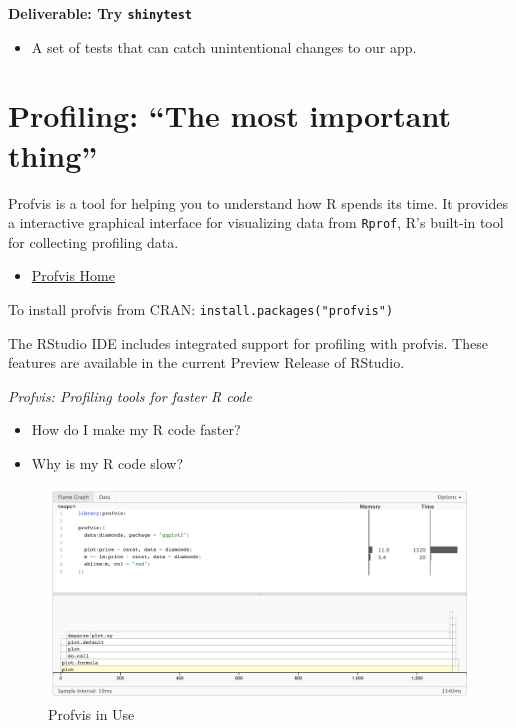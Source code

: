 \documentclass[]{book}
\providecommand{\tightlist}{%
  \setlength{\itemsep}{0pt}\setlength{\parskip}{0pt}}
\theoremstyle{definition}
\theoremstyle{definition}
\theoremstyle{definition}
\theoremstyle{remark}
\begin{document}
\textbf{Deliverable: Try \texttt{shinytest}}

\begin{itemize}
\tightlist
\item
  A set of tests that can catch unintentional changes to our app.
\end{itemize}

\hypertarget{profiling-the-most-important-thing}{%
\chapter{Profiling: ``The most important
thing''}\label{profiling-the-most-important-thing}}

Profvis is a tool for helping you to understand how R spends its time.
It provides a interactive graphical interface for visualizing data from
\texttt{Rprof}, R's built-in tool for collecting profiling data.

\begin{itemize}
\tightlist
\item
  \href{https://rstudio.github.io/profvis/}{Profvis Home}
\end{itemize}

To install profvis from CRAN: \texttt{install.packages("profvis")}

The RStudio IDE includes integrated support for profiling with profvis.
These features are available in the current Preview Release of RStudio.

\emph{Profvis: Profiling tools for faster R code}

\begin{itemize}
\tightlist
\item
  How do I make my R code faster?
\item
  Why is my R code slow?
\end{itemize}

\begin{figure}
\centering
\includegraphics{imgs/profiling/use-profvis.png}
\caption{Profvis in Use}
\end{figure}
\end{document}
